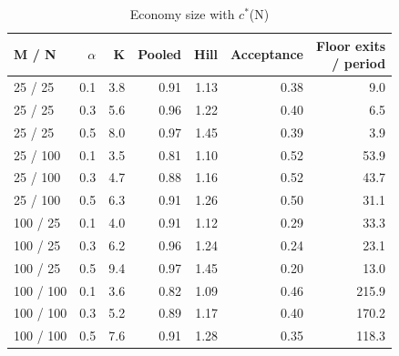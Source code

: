 \begin{table}[htbp]
\centering
\caption{Economy size with $c^*$(N)}
\label{tab:a11c_size}
\small
\begin{tabular}{lrrrrrr}
\toprule
M / N & $\alpha$ & K & Pooled & Hill & Acceptance & \makecell[b]{Floor exits\\{}/ period} \\
\midrule
25 / 25 & 0.1 & 3.8 & 0.91 & 1.13 & 0.38 & 9.0 \\
25 / 25 & 0.3 & 5.6 & 0.96 & 1.22 & 0.40 & 6.5 \\
25 / 25 & 0.5 & 8.0 & 0.97 & 1.45 & 0.39 & 3.9 \\
25 / 100 & 0.1 & 3.5 & 0.81 & 1.10 & 0.52 & 53.9 \\
25 / 100 & 0.3 & 4.7 & 0.88 & 1.16 & 0.52 & 43.7 \\
25 / 100 & 0.5 & 6.3 & 0.91 & 1.26 & 0.50 & 31.1 \\
100 / 25 & 0.1 & 4.0 & 0.91 & 1.12 & 0.29 & 33.3 \\
100 / 25 & 0.3 & 6.2 & 0.96 & 1.24 & 0.24 & 23.1 \\
100 / 25 & 0.5 & 9.4 & 0.97 & 1.45 & 0.20 & 13.0 \\
100 / 100 & 0.1 & 3.6 & 0.82 & 1.09 & 0.46 & 215.9 \\
100 / 100 & 0.3 & 5.2 & 0.89 & 1.17 & 0.40 & 170.2 \\
100 / 100 & 0.5 & 7.6 & 0.91 & 1.28 & 0.35 & 118.3 \\
\bottomrule
\end{tabular}
\end{table}
